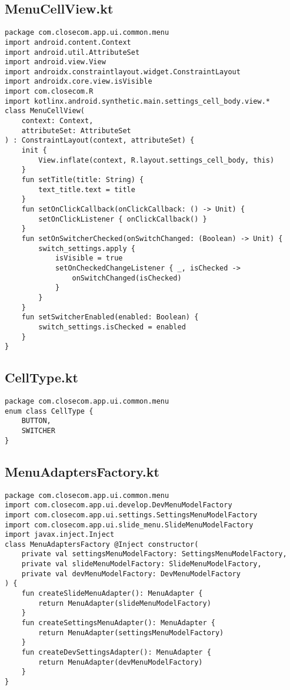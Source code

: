 \documentclass[listing]{espd}
\begin{document}
\subsection{MenuCellView.kt}
\begin{verbatim}
package com.closecom.app.ui.common.menu
import android.content.Context
import android.util.AttributeSet
import android.view.View
import androidx.constraintlayout.widget.ConstraintLayout
import androidx.core.view.isVisible
import com.closecom.R
import kotlinx.android.synthetic.main.settings_cell_body.view.*
class MenuCellView(
    context: Context,
    attributeSet: AttributeSet
) : ConstraintLayout(context, attributeSet) {
    init {
        View.inflate(context, R.layout.settings_cell_body, this)
    }
    fun setTitle(title: String) {
        text_title.text = title
    }
    fun setOnClickCallback(onClickCallback: () -> Unit) {
        setOnClickListener { onClickCallback() }
    }
    fun setOnSwitcherChecked(onSwitchChanged: (Boolean) -> Unit) {
        switch_settings.apply {
            isVisible = true
            setOnCheckedChangeListener { _, isChecked ->
                onSwitchChanged(isChecked)
            }
        }
    }
    fun setSwitcherEnabled(enabled: Boolean) {
        switch_settings.isChecked = enabled
    }
}
\end{verbatim}

\subsection{CellType.kt}
\begin{verbatim}
package com.closecom.app.ui.common.menu
enum class CellType {
    BUTTON,
    SWITCHER
}
\end{verbatim}

\subsection{MenuAdaptersFactory.kt}
\begin{verbatim}
package com.closecom.app.ui.common.menu
import com.closecom.app.ui.develop.DevMenuModelFactory
import com.closecom.app.ui.settings.SettingsMenuModelFactory
import com.closecom.app.ui.slide_menu.SlideMenuModelFactory
import javax.inject.Inject
class MenuAdaptersFactory @Inject constructor(
    private val settingsMenuModelFactory: SettingsMenuModelFactory,
    private val slideMenuModelFactory: SlideMenuModelFactory,
    private val devMenuModelFactory: DevMenuModelFactory
) {
    fun createSlideMenuAdapter(): MenuAdapter {
        return MenuAdapter(slideMenuModelFactory)
    }
    fun createSettingsMenuAdapter(): MenuAdapter {
        return MenuAdapter(settingsMenuModelFactory)
    }
    fun createDevSettingsAdapter(): MenuAdapter {
        return MenuAdapter(devMenuModelFactory)
    }
}
\end{verbatim}
\end{document}
